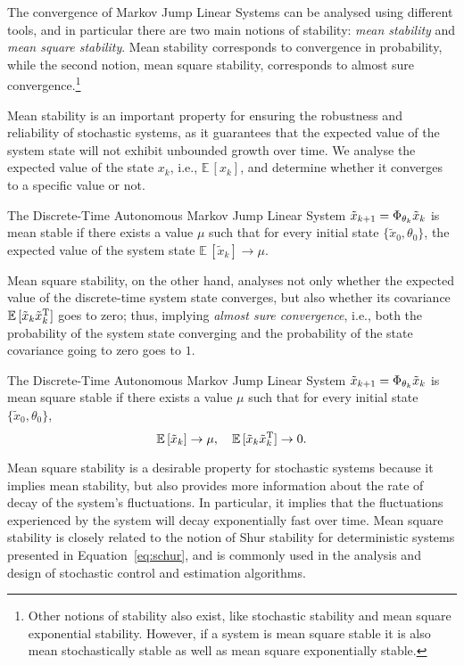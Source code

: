 The convergence of Markov Jump Linear Systems can be analysed using different tools, and in particular there are two main notions of stability: \emph{mean stability} and \emph{mean square stability}.
Mean stability corresponds to convergence in probability, while the second notion, mean square stability, corresponds to almost sure convergence.\footnote{Other notions of stability also exist, like stochastic stability and mean square exponential stability. However, if a system is mean square stable it is also mean stochastically stable as well as mean square exponentially stable.}%

Mean stability is an important property for ensuring the robustness and reliability of stochastic systems, as it guarantees that the expected value of the system state will not exhibit unbounded growth over time.
We analyse the expected value of the state $x_k$, i.e., $\mathbb{E}\,[x_k]$, and determine whether it converges to a specific value or not.

\begin{definition}%
    The Discrete-Time Autonomous Markov Jump Linear System $\tilde{x}_{k+1} = \Phi_{\theta_k} \tilde{x}_k$ is mean stable if there exists a value $\mu$ such that for every initial state $\{\tilde{x}_0, \theta_0\}$, the expected value of the system state $\mathbb{E}\,[\tilde{x}_k] \to \mu$.
\end{definition}

Mean square stability, on the other hand, analyses not only whether the expected value of the discrete-time system state converges, but also whether its covariance $\mathbb{E}\,[\tilde{x}_k \tilde{x}^{\mathrm{\small{T}}}_k]$ goes to zero; thus, implying \emph{almost sure convergence}, i.e., both the probability of the system state converging and the probability of the state covariance going to zero goes to $1$.

\begin{definition}%
    The Discrete-Time Autonomous Markov Jump Linear System $\tilde{x}_{k+1} = \Phi_{\theta_k} \tilde{x}_k$ is mean square stable if there exists a value $\mu$ such that for every initial state $\{\tilde{x}_0, \theta_0\}$,
    \begin{equation*}
        \mathbb{E}\,[\tilde{x}_k] \to \mu, \quad \mathbb{E}\,[\tilde{x}_k \tilde{x}^{\mathrm{\small{T}}}_k] \to 0.
    \end{equation*}
\end{definition}
Mean square stability is a desirable property for stochastic systems because it implies mean stability, but also provides more information about the rate of decay of the system's fluctuations.
In particular, it implies that the fluctuations experienced by the system will decay exponentially fast over time.
Mean square stability is closely related to the notion of Shur stability for deterministic systems presented in Equation~\eqref{eq:schur}, and is commonly used in the analysis and design of stochastic control and estimation algorithms.

